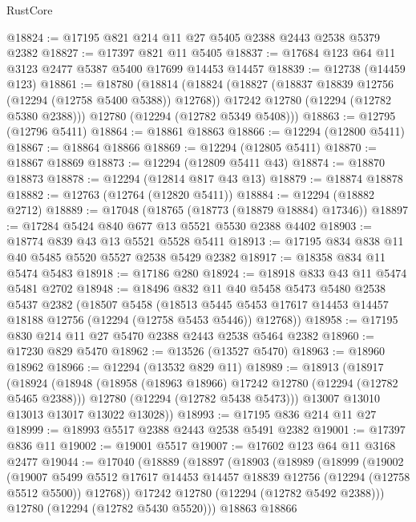 \begin{lexlean}{RustCore}
\begin{coremodule}
@18824 := @17195 @821 @214 @11 @27 @5405 @2388 @2443 @2538 @5379 @2382
@18827 := @17397 @821 @11 @5405
@18837 := @17684 @123 @64 @11 @3123 @2477 @5387 @5400 @17699 @14453 @14457
@18839 := @12738 (@14459 @123)
@18861 := @18780
    (@18814
      (@18824
        (@18827 (@18837 @18839 @12756 (@12294 (@12758 @5400 @5388)) @12768))
        @17242
        @12780
        (@12294 (@12782 @5380 @2388)))
      @12780
      (@12294 (@12782 @5349 @5408)))
@18863 := @12795 (@12796 @5411)
@18864 := @18861 @18863
@18866 := @12294 (@12800 @5411)
@18867 := @18864 @18866
@18869 := @12294 (@12805 @5411)
@18870 := @18867 @18869
@18873 := @12294 (@12809 @5411 @43)
@18874 := @18870 @18873
@18878 := @12294 (@12814 @817 @43 @13)
@18879 := @18874 @18878
@18882 := @12763 (@12764 (@12820 @5411))
@18884 := @12294 (@18882 @2712)
@18889 := @17048 (@18765 (@18773 (@18879 @18884) @17346))
@18897 := @17284 @5424 @840 @677 @13 @5521 @5530 @2388 @4402
@18903 := @18774 @839 @43 @13 @5521 @5528 @5411
@18913 := @17195 @834 @838 @11 @40 @5485 @5520 @5527 @2538 @5429 @2382
@18917 := @18358 @834 @11 @5474 @5483
@18918 := @17186 @280
@18924 := @18918 @833 @43 @11 @5474 @5481 @2702
@18948 := @18496
    @832
    @11
    @40
    @5458
    @5473
    @5480
    @2538
    @5437
    @2382
    (@18507
      @5458
      (@18513 @5445 @5453 @17617 @14453 @14457 @18188 @12756 (@12294 (@12758 @5453 @5446)) @12768))
@18958 := @17195 @830 @214 @11 @27 @5470 @2388 @2443 @2538 @5464 @2382
@18960 := @17230 @829 @5470
@18962 := @13526 (@13527 @5470)
@18963 := @18960 @18962
@18966 := @12294 (@13532 @829 @11)
@18989 := @18913
    (@18917
      (@18924
        (@18948
          (@18958 (@18963 @18966) @17242 @12780 (@12294 (@12782 @5465 @2388)))
          @12780
          (@12294 (@12782 @5438 @5473)))
        @13007
        @13010
        @13013
        @13017
        @13022
        @13028))
@18993 := @17195 @836 @214 @11 @27
@18999 := @18993 @5517 @2388 @2443 @2538 @5491 @2382
@19001 := @17397 @836 @11
@19002 := @19001 @5517
@19007 := @17602 @123 @64 @11 @3168 @2477
@19044 := @17040
    (@18889
      (@18897
        (@18903
          (@18989
            (@18999
              (@19002
                (@19007
                  @5499
                  @5512
                  @17617
                  @14453
                  @14457
                  @18839
                  @12756
                  (@12294 (@12758 @5512 @5500))
                  @12768))
              @17242
              @12780
              (@12294 (@12782 @5492 @2388)))
            @12780
            (@12294 (@12782 @5430 @5520)))
          @18863
          @18866

\end{coremodule}
\end{lexlean}
